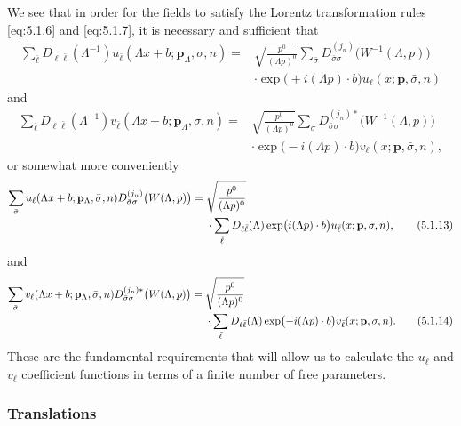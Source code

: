 We see that in order for the fields to satisfy the Lorentz transformation
rules \eqref{eq:5.1.6} and \eqref{eq:5.1.7}, it is necessary and sufficient that
\begin{align*}
  \sum_{\bar\ell}D_{\ell\bar\ell}(\Lambda^{-1})
  u_{\bar\ell}(\Lambda x+b;\mathbf{p}_\Lambda,\sigma,n)
  ={}&\sqrt{\frac{p^0}{(\Lambda p)^0}}
  \sum_{\bar\sigma}D^{(j_n)}_{\bar\sigma\sigma}
  \bigl(W^{-1}(\Lambda,p)\bigr)
  \\
  &\cdot\exp\bigl(+i(\Lambda p)\cdot b\bigr)
  u_\ell(x;\mathbf{p},\bar\sigma,n)
\end{align*}
and
\begin{align*}
  \sum_{\bar\ell}D_{\ell\bar\ell}(\Lambda^{-1})
  v_{\bar\ell}(\Lambda x+b;\mathbf{p}_\Lambda,\sigma,n)
  ={}&\sqrt{\frac{p^0}{(\Lambda p)^0}}
  \sum_{\bar\sigma}D^{(j_n)*}_{\bar\sigma\sigma}
  \bigl(W^{-1}(\Lambda,p)\bigr)
  \\
  &\cdot\exp\bigl(-i(\Lambda p)\cdot b\bigr)
  v_\ell(x;\mathbf{p},\bar\sigma,n),
\end{align*}
or somewhat more conveniently
\begin{align}
  \sum_{\bar\sigma}u_\ell(\Lambda x+b;\mathbf{p}_\Lambda,\bar\sigma,n)
  D^{(j_n)}_{\bar\sigma\sigma}\bigl(W(\Lambda,p)\bigr)
  ={}&\sqrt{\frac{p^0}{(\Lambda p)^0}}
  \notag\\[-2pt]
  &\cdot\sum_{\bar\ell}D_{\ell\bar\ell}(\Lambda)
  \exp\bigl(i(\Lambda p)\cdot b\bigr)
  u_{\bar\ell}(x;\mathbf{p},\sigma,n),
  \tag{5.1.13}\label{eq:5.1.13}
\end{align}
and
\begin{align}
  \sum_{\bar\sigma}v_\ell(\Lambda x+b;\mathbf{p}_\Lambda,\bar\sigma,n)
  D^{(j_n)*}_{\bar\sigma\sigma}\bigl(W(\Lambda,p)\bigr)
  ={}&\sqrt{\frac{p^0}{(\Lambda p)^0}}
  \notag\\[-2pt]
  &\cdot\sum_{\bar\ell}D_{\ell\bar\ell}(\Lambda)
  \exp\bigl(-i(\Lambda p)\cdot b\bigr)
  v_{\bar\ell}(x;\mathbf{p},\sigma,n).
  \tag{5.1.14}\label{eq:5.1.14}
\end{align}
These are the fundamental requirements that will allow us to calculate the
$u_\ell$ and $v_\ell$ coefficient functions in terms of a finite number of
free parameters.

\subsubsection*{Translations}

